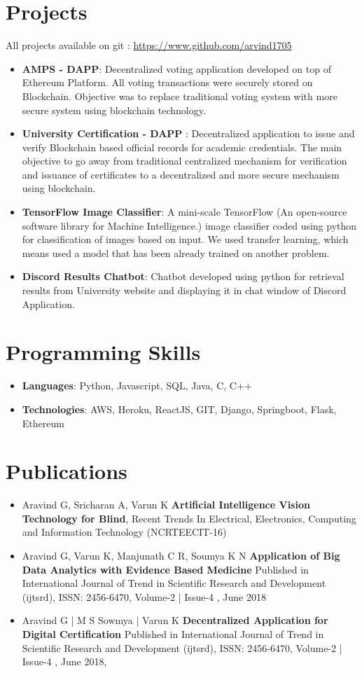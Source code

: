 \documentclass[letterpaper,11pt]{article}
\newcommand{\resumeItem}[2]{
  \item\small{
    \textbf{#1}{: #2 \vspace{-2pt}}
  }
}
\newcommand{\resumeSubItem}[2]{\resumeItem{#1}{#2}\vspace{-4pt}}
\newcommand{\resumeSubHeadingListStart}{\begin{itemize}[leftmargin=*]}
\newcommand{\resumeSubHeadingListEnd}{\end{itemize}}
\begin{document}
\section{Projects} All projects available on git : \url{https://www.github.com/arvind1705}
  \resumeSubHeadingListStart
    \resumeSubItem{AMPS - DAPP}
      {Decentralized voting application developed on top of Ethereum Platform. All voting transactions were securely stored on Blockchain. Objective was to replace traditional voting system with more secure system using blockchain technology. }
    \resumeSubItem{University Certification - DAPP }
      {Decentralized application to issue and verify Blockchain based official records for academic credentials. The main objective to go away from traditional centralized mechanism for verification and issuance of certificates to a decentralized and more secure mechanism using blockchain. }
    \resumeSubItem{TensorFlow Image Classifier}
      {A mini-scale TensorFlow (An open-source software library for
      Machine Intelligence.) image classifier coded using python for classification of images based on
      input. We used transfer learning, which means used a model that has been already trained on
      another problem.}
    \resumeSubItem{Discord Results Chatbot}
      {Chatbot developed using python for retrieval results from University website and displaying it in chat window of Discord Application.}
  \resumeSubHeadingListEnd


\section{Programming Skills}
\resumeSubHeadingListStart
  \item{
    \textbf{Languages}{: Python, Javascript, SQL, Java, C, C++}
  }
  \item {
    \textbf{Technologies}{: AWS, Heroku, ReactJS, GIT, Django, Springboot, Flask, Ethereum}
  }
\resumeSubHeadingListEnd

\section{Publications}
 \resumeSubHeadingListStart
   \item{
    Aravind G, Sricharan A, Varun K \textbf{Artificial Intelligence Vision Technology for
    Blind}, Recent Trends In Electrical, Electronics, Computing and
    Information Technology (NCRTEECIT-16)
   }
   \item  Aravind G, Varun K, Manjunath C R, Soumya K N
   \textbf{Application of Big Data Analytics with Evidence Based Medicine}
   Published in International Journal of Trend in Scientific Research and Development (ijtsrd), 
   ISSN: 2456-6470, Volume-2 | Issue-4 , June 2018
   \item Aravind G | M S Sowmya | Varun K 
   \textbf{Decentralized Application for Digital Certification}
   Published in International Journal of Trend in Scientific Research and Development (ijtsrd), 
   ISSN: 2456-6470, Volume-2 | Issue-4 , June 2018, 
   
 \resumeSubHeadingListEnd

 


\end{document}
